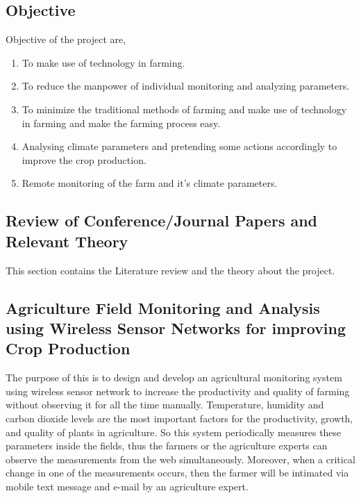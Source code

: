 \documentclass[10pt,a4paper]{article}
\begin{document}
\begin{large}
\section{Objective}
\end{large}
Objective of the project are,\\
\begin{enumerate}
\item To make use of technology in farming.
\item To reduce the manpower of individual monitoring and analyzing parameters.
\item To minimize the traditional methods of farming and make use of technology in farming and make the farming process easy.
\item Analysing climate parameters and pretending some actions accordingly to improve the crop production.
\item Remote monitoring of the farm and it's climate parameters.
\end{enumerate}


\begin{large}
\section{Review of Conference/Journal Papers and Relevant Theory}
\end{large}

\quad
This section contains the Literature review and the theory about the project. 

\subsection{Agriculture Field Monitoring and Analysis using Wireless Sensor Networks for improving Crop Production}

\quad
The purpose of this is to design and develop an agricultural monitoring system using wireless sensor network to increase the productivity and quality of farming without observing it for all the time manually. Temperature, humidity and carbon dioxide levels are the most important factors for the productivity, growth, and quality of plants in agriculture. So this system periodically measures these parameters inside the fields, thus the farmers or the agriculture experts can observe the measurements from the web simultaneously. Moreover, when a critical change in one of the measurements occurs, then the farmer will be intimated via mobile text message and e-mail by an agriculture expert. \cite{1}
 
\end{document}
